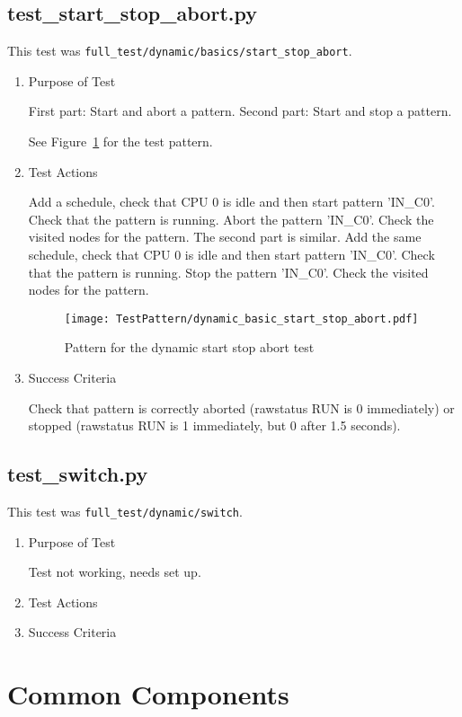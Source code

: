 \documentclass[12pt,a4paper]{report}
\begin{document}
\section{test\_start\_stop\_abort.py}
This test was \texttt{full\_test/dynamic/basics/start\_stop\_abort}.
\begin{enumerate}
	\item Purpose of Test

    First part: Start and abort a pattern. Second part: Start and stop a pattern.

	See Figure~\ref{fig:Pattern_for_the_dynamic_start_stop_abort_test} for the test pattern.
	\item Test Actions

    Add a schedule, check that CPU 0 is idle and then start pattern 'IN\_C0'. Check that the pattern is running.
    Abort the pattern 'IN\_C0'. Check the visited nodes for the pattern. The second part is similar.
    Add the same schedule, check that CPU 0 is idle and then start pattern 'IN\_C0'. Check that the pattern is running.
    Stop the pattern 'IN\_C0'. Check the visited nodes for the pattern.
    \begin{figure}
        \centering
        \texttt{[image: TestPattern/dynamic\_basic\_start\_stop\_abort.pdf]}
        \caption{Pattern for the dynamic start stop abort test}
        \label{fig:Pattern_for_the_dynamic_start_stop_abort_test}
    \end{figure}
	\item Success Criteria

	Check that pattern is correctly aborted (rawstatus RUN is 0 immediately) or
	stopped (rawstatus RUN is 1 immediately, but 0 after 1.5 seconds).
\end{enumerate}

\section{test\_switch.py}
This test was \texttt{full\_test/dynamic/switch}.
\begin{enumerate}
	\item Purpose of Test

	Test not working, needs set up.
	\item Test Actions
	\item Success Criteria
\end{enumerate}
\chapter{Common Components}
\end{document}
